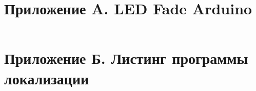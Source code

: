 \appendix

\section[Приложение A]{Приложение A. LED Fade Arduino}

\inputminted[fontsize=\small,breaklines]{arduino}{content/source/ex1.ino}
\vspace{-1em}

\section[Приложение Б]{Приложение Б. Листинг программы локализации}

\inputminted[fontsize=\small,breaklines]{python}{content/source/ex2.py}
\vspace{-1em}
